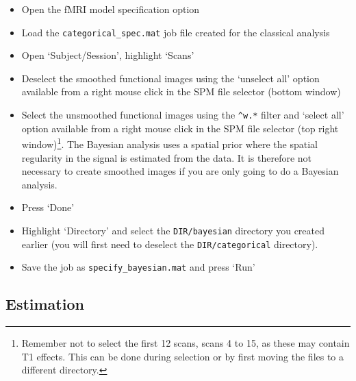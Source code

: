 \documentclass[a4paper,titlepage]{book}
\newcommand{\bi}{\begin{itemize}}
\newcommand{\ei}{\end{itemize}}
\begin{document}
\bi
\item{Open the fMRI model specification option}
\item{Load the \verb!categorical_spec.mat! job file created for the 
classical analysis}
\item{Open `Subject/Session', highlight `Scans'} \item{Deselect the smoothed functional images using the `unselect all' option available from a right mouse click in the SPM file selector (bottom window)}
\item{Select the 
unsmoothed functional images using the \verb!^w.*! filter and `select all' option available from a right mouse click in the SPM file selector (top right window)\footnote{Remember not to select the first 12 scans, scans 4 to 15, as these may contain T1 effects. This can be done during selection or by first moving the files to a different directory.}.
The Bayesian analysis uses a spatial prior where the spatial regularity in the signal is estimated from the data. It is therefore not necessary to create smoothed images if you are only going to do a Bayesian analysis.}
\item{Press `Done'}
\item{Highlight `Directory' and select the 
\verb!DIR/bayesian! directory you created earlier (you will first need to deselect the \verb!DIR/categorical! directory).}
\item{Save the job as \verb!specify_bayesian.mat! and press `Run'}
\ei

\subsection{Estimation}
\end{document}
